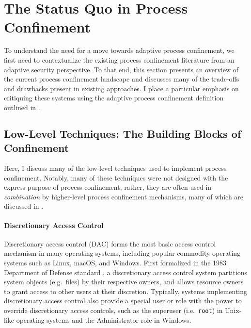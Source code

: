 \documentclass[dvipsnames, 12pt]{article}
\begin{document}
\section{The Status Quo in Process Confinement}
\label{sec:status_quo}

To understand the need for a move towards adaptive process confinement, we first
need to contextualize the existing process confinement literature from an
adaptive security perspective. To that end, this section presents an overview of
the current process confinement landscape and discusses many of the trade-offs
and drawbacks present in existing approaches. I place a particular emphasis
on critiquing these systems using the adaptive process confinement definition
outlined in .


\subsection{Low-Level Techniques: The Building Blocks of Confinement}
\label{sec:low-level}

Here, I discuss many of the low-level techniques used to implement
process confinement. Notably, many of these techniques were not designed
with the express purpose of process confinement; rather, they are
often used in \textit{combination} by higher-level process confinement
mechanisms, many of which are discussed in .


\paragraph*{Discretionary Access Control}
Discretionary access control (DAC) forms the most basic access control mechanism
in many operating systems, including popular commodity operating systems such as
Linux, macOS, and Windows.  First formalized in the 1983 Department of Defense
standard \cite{orange_book}, a discretionary access control system partitions
system objects (e.g.~files) by their respective owners, and allows resource
owners to grant access to other users at their discretion.  Typically, systems
implementing discretionary access control also provide a special user or role
with the power to override discretionary access controls, such as the superuser
(i.e.~\texttt{root}) in Unix-like operating systems and the Administrator role
in Windows.
\end{document}
